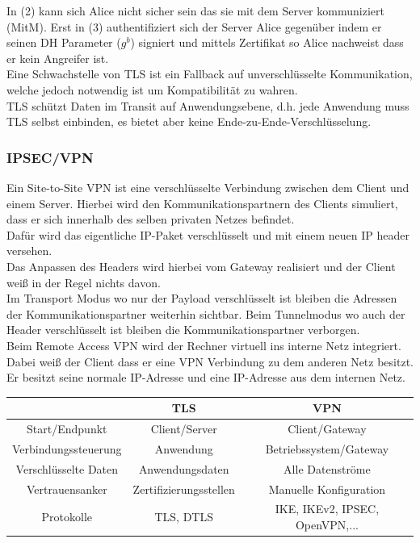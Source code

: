 \documentclass[a4paper,12pt,leqno]{article}
\begin{document}
In (2) kann sich Alice nicht sicher sein das sie mit dem Server kommuniziert (MitM). Erst in (3) authentifiziert sich der Server Alice gegenüber indem er seinen DH Parameter ($g^b$) signiert und mittels Zertifikat so Alice nachweist dass er kein Angreifer ist.\\
Eine Schwachstelle von TLS ist ein Fallback auf unverschlüsselte Kommunikation, welche jedoch notwendig ist um Kompatibilität zu wahren.\\

TLS schützt Daten im Transit auf Anwendungsebene, d.h. jede Anwendung muss TLS selbst einbinden, es bietet aber keine Ende-zu-Ende-Verschlüsselung.

\subsubsection{IPSEC/VPN}

Ein Site-to-Site VPN ist eine verschlüsselte Verbindung zwischen dem Client und einem Server. Hierbei wird den Kommunikationspartnern des Clients simuliert, dass er sich innerhalb des selben privaten Netzes befindet.\\
Dafür wird das eigentliche IP-Paket verschlüsselt und mit einem neuen IP header versehen.\\
Das Anpassen des Headers wird hierbei vom Gateway realisiert und der Client weiß in der Regel nichts davon.\\

Im Transport Modus wo nur der Payload verschlüsselt ist bleiben die Adressen der Kommunikationspartner weiterhin sichtbar. Beim Tunnelmodus wo auch der Header verschlüsselt ist bleiben die Kommunikationspartner verborgen.\\

Beim Remote Access VPN wird der Rechner virtuell ins interne Netz integriert. Dabei weiß der Client dass er eine VPN Verbindung zu dem anderen Netz besitzt. Er besitzt seine normale IP-Adresse und eine IP-Adresse aus dem internen Netz.\\

\begin{tabular}{|c|c|c|}
\hline
& TLS & VPN\\
\hline
Start/Endpunkt & Client/Server & Client/Gateway\\
Verbindungssteuerung & Anwendung & Betriebssystem/Gateway\\
Verschlüsselte Daten & Anwendungsdaten & Alle Datenströme\\
Vertrauensanker & Zertifizierungsstellen & Manuelle Konfiguration\\
Protokolle & TLS, DTLS & IKE, IKEv2, IPSEC, OpenVPN,... \\
\hline
\end{tabular}
\end{document}
